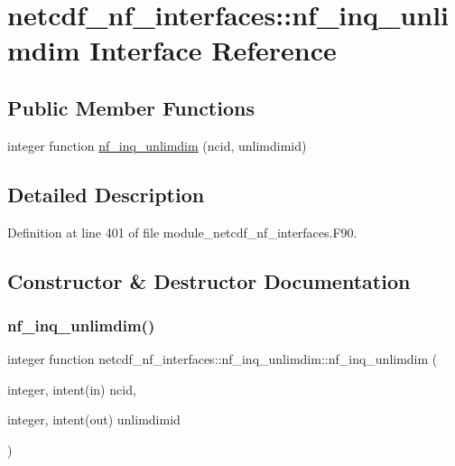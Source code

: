 \hypertarget{interfacenetcdf__nf__interfaces_1_1nf__inq__unlimdim}{}\section{netcdf\+\_\+nf\+\_\+interfaces\+:\+:nf\+\_\+inq\+\_\+unlimdim Interface Reference}
\label{interfacenetcdf__nf__interfaces_1_1nf__inq__unlimdim}
\subsection*{Public Member Functions}
\begin{DoxyCompactItemize}
\item 
integer function \hyperlink{interfacenetcdf__nf__interfaces_1_1nf__inq__unlimdim_a4ccc4e1536e5ced4c26ecc2eba615c58}{nf\+\_\+inq\+\_\+unlimdim} (ncid, unlimdimid)
\end{DoxyCompactItemize}


\subsection{Detailed Description}


Definition at line 401 of file module\+\_\+netcdf\+\_\+nf\+\_\+interfaces.\+F90.



\subsection{Constructor \& Destructor Documentation}
\mbox{\label{interfacenetcdf__nf__interfaces_1_1nf__inq__unlimdim_a4ccc4e1536e5ced4c26ecc2eba615c58}} 
\subsubsection{\texorpdfstring{nf\+\_\+inq\+\_\+unlimdim()}{nf\_inq\_unlimdim()}}
{\footnotesize\ttfamily integer function netcdf\+\_\+nf\+\_\+interfaces\+::nf\+\_\+inq\+\_\+unlimdim\+::nf\+\_\+inq\+\_\+unlimdim (\begin{DoxyParamCaption}\item[{integer, intent(in)}]{ncid,  }\item[{integer, intent(out)}]{unlimdimid }\end{DoxyParamCaption})}



